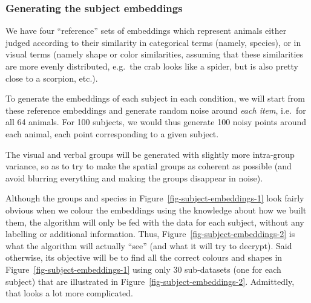 \documentclass[
  authoryear]{elsarticle}
\begin{document}
\subsubsection{Generating the subject
embeddings}\label{generating-the-subject-embeddings}

We have four ``reference'' sets of embeddings which represent animals
either judged according to their similarity in categorical terms
(namely, species), or in visual terms (namely shape or color
similarities, assuming that these similarities are more evenly
distributed, e.g.~the crab looks like a spider, but is also pretty close
to a scorpion, etc.).

To generate the embeddings of each subject in each condition, we will
start from these reference embeddings and generate random noise around
\emph{each item}, i.e.~for all 64 animals. For 100 subjects, we would
thus generate 100 noisy points around each animal, each point
corresponding to a given subject.

The visual and verbal groups will be generated with slightly more
intra-group variance, so as to try to make the spatial groups as
coherent as possible (and avoid blurring everything and making the
groups disappear in noise).

Although the groups and species in Figure~\ref{fig-subject-embeddings-1}
look fairly obvious when we colour the embeddings using the knowledge
about how we built them, the algorithm will only be fed with the data
for each subject, without any labelling or additional information. Thus,
Figure~\ref{fig-subject-embeddings-2} is what the algorithm will
actually ``see'' (and what it will try to decrypt). Said otherwise, its
objective will be to find all the correct colours and shapes in
Figure~\ref{fig-subject-embeddings-1} using only 30 sub-datasets (one
for each subject) that are illustrated in
Figure~\ref{fig-subject-embeddings-2}. Admittedly, that looks a lot more
complicated.
\end{document}
